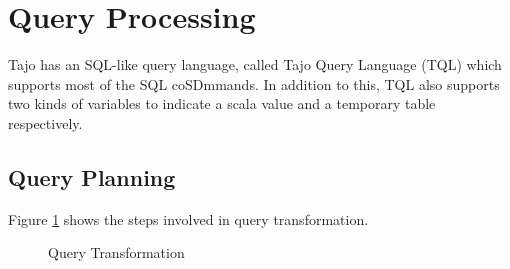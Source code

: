 \documentclass[9pt,twocolumn,twoside]{styles/osajnl}
\begin{document}
\section{Query Processing}
Tajo has an SQL-like query language, called
\cite{www-apache-tajo-tsql} Tajo Query Language (TQL) which supports
most of the SQL coSDmmands. In addition to this, TQL also supports two
kinds of variables to indicate a scala value and a temporary table
respectively.

\subsection{Query Planning}

Figure \ref{fig:queryplanning} shows the steps involved in query transformation. 

\begin{figure}[htbp]
\centering
{}
\caption{\cite{tajo-paper} Query Transformation}
\label{fig:queryplanning}
\end{figure}
\end{document}
